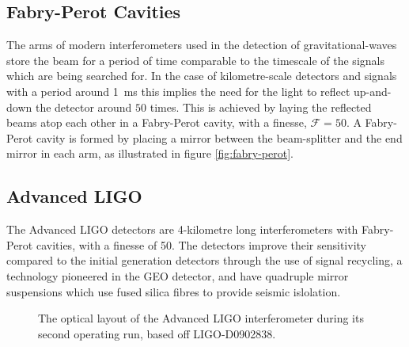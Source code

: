 \subsection{Fabry-Perot Cavities}
\label{sec:fabry-perot-cavities}
%
%
The arms of modern interferometers used in the detection of
gravitational-waves store the beam for a period of time comparable to
the timescale of the signals which are being searched for. In the case
of kilometre-scale detectors and signals with a period around
\SI{1}{\milli\second} this implies the need for the light to reflect
up-and-down the detector around $50$ times. This is achieved by laying
the reflected beams atop each other in a Fabry-Perot cavity, with a
\gls{finesse}, $\mathcal{F}=50$. A Fabry-Perot cavity is formed by
placing a mirror between the beam-splitter and the end mirror in each
arm, as illustrated in figure \ref{fig:fabry-perot}.

\subsection{Advanced LIGO}
\label{sec:advanced-ligo}

The Advanced LIGO detectors are 4-kilometre long interferometers with
Fabry-Perot cavities, with a finesse of 50. The detectors improve
their sensitivity compared to the initial generation detectors through
the use of signal recycling, a technology pioneered in the GEO
detector, and have quadruple mirror suspensions which use fused silica
fibres to provide seismic
islolation\cite{2002CQGra..19.4043R,2012CQGra..29w5004A}.
  \begin{figure}
  \centering
  \scalebox{0.5}{
  
  }
  \caption{The optical layout of the Advanced LIGO interferometer during its second operating run, based off LIGO-D0902838.}
  \label{fig:aligo-optical-layout}
\end{figure}


